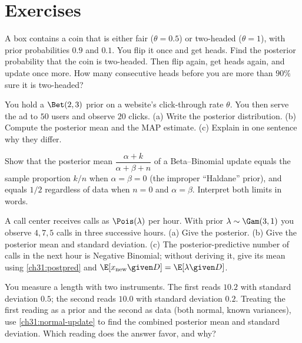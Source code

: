 \section{Exercises}
\label{ch31:exercises}

\begin{exercise}
A box contains a coin that is either fair ($\theta = 0.5$) or two-headed ($\theta=1$), with
prior probabilities $0.9$ and $0.1$. You flip it once and get heads. Find the posterior
probability that the coin is two-headed. Then flip again, get heads again, and update once
more. How many consecutive heads before you are more than $90\%$ sure it is two-headed?
\end{exercise}

\begin{exercise}
You hold a $\Bet(2,3)$ prior on a website's click-through rate $\theta$. You then serve the
ad to $50$ users and observe $20$ clicks. (a) Write the posterior distribution. (b) Compute
the posterior mean and the MAP estimate. (c) Explain in one sentence why they differ.
\end{exercise}

\begin{exercise}
Show that the posterior mean $\dfrac{\alpha+k}{\alpha+\beta+n}$ of a Beta--Binomial update
equals the sample proportion $k/n$ when $\alpha=\beta=0$ (the improper ``Haldane'' prior),
and equals $1/2$ regardless of data when $n=0$ and $\alpha=\beta$. Interpret both limits in
words.
\end{exercise}

\begin{exercise}
A call center receives calls as $\Pois(\lambda)$ per hour. With prior $\lambda\sim\Gam(3,1)$
you observe $4, 7, 5$ calls in three successive hours. (a) Give the posterior. (b) Give the
posterior mean and standard deviation. (c) The posterior-predictive number of calls in the
next hour is Negative Binomial; without deriving it, give its mean using
\eqref{ch31:postpred} and $\E[x_{\text{new}}\given D]=\E[\lambda\given D]$.
\end{exercise}

\begin{exercise}
You measure a length with two instruments. The first reads $10.2$ with standard deviation
$0.5$; the second reads $10.0$ with standard deviation $0.2$. Treating the first reading as
a prior and the second as data (both normal, known variances), use
\eqref{ch31:normal-update} to find the combined posterior mean and standard deviation.
Which reading does the answer favor, and why?
\end{exercise}

